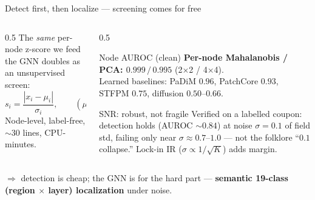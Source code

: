 \documentclass[aspectratio=169,12pt]{beamer}
\newcommand{\best}[1]{{\color{okgreen}\textbf{#1}}}
\begin{document}
\begin{frame}{Detect first, then localize --- screening comes for free}
\begin{columns}[T]
\begin{column}{0.5\textwidth}
\vspace{0.5em}
The \emph{same} per-node z-score we feed the GNN doubles as an unsupervised
screen:
\[
  s_i = \frac{|x_i-\mu_i|}{\sigma_i},\qquad
  (\mu_i,\sigma_i)\ \text{from } N{=}2000\ \text{healthy fields.}
\]
Node-level, label-free, $\sim$30 lines, CPU-minutes.
\end{column}
\begin{column}{0.5\textwidth}
\begin{block}{Node AUROC (clean)}
\best{Per-node Mahalanobis / PCA: $0.999\,/\,0.995$} (2$\times$2 / 4$\times$4).\\[2pt]
{\scriptsize Learned baselines: PaDiM $0.96$, PatchCore $0.93$,
STFPM $0.75$, diffusion $0.50$--$0.66$.}
\end{block}
\begin{alertblock}{SNR: robust, not fragile}
Verified on a labelled coupon: detection holds (AUROC ${\sim}0.84$) at noise
$\sigma{=}0.1$ of field std, failing only near $\sigma{\approx}0.7$--$1.0$ ---
not the folklore ``$0.1$ collapse.'' Lock-in IR ($\sigma\!\propto\!1/\sqrt{K}$)
adds margin.
\end{alertblock}
\end{column}
\end{columns}
\vspace{0.3em}
$\Rightarrow$ detection is cheap; the GNN is for the hard part ---
\textbf{semantic 19-class (region $\times$ layer) localization} under noise.
\end{frame}
\end{document}
